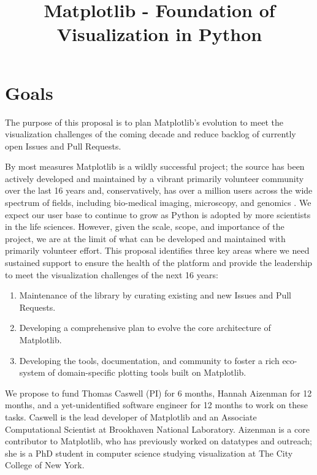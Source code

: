 \documentclass[11pt]{article}  %
\begin{document}
\title{Matplotlib - Foundation of Visualization in Python}
\author{}
\maketitle

\section{Goals}

The purpose of this proposal is to plan Matplotlib's evolution to meet
the visualization challenges of the coming decade and reduce backlog
of currently open Issues and Pull Requests.

By most measures Matplotlib is a wildly successful project; the source
has been actively developed and maintained by a vibrant primarily
volunteer community over the last 16 years and, conservatively, has
over a million users across the wide spectrum of fields, including
bio-medical imaging, microscopy, and genomics
\cite{Carpenter2006,Wolf2018,10.7717/peerj.453}
\cite{Segata2011,10.1371/journal.pgen.1000695,HASHIMSHONY2012666,
  10.1093/bioinformatics/bts480,Carlile2014,Laganowsky2014,Jiangaac9462,
  10.3389/fninf.2014.00014}.  We expect our user base to continue to
grow as Python is adopted by more scientists in the life sciences.
However, given the scale, scope, and importance of the project, we are
at the limit of what can be developed and maintained with primarily
volunteer effort.  This proposal identifies three key areas where we
need sustained support to ensure the health of the platform and
provide the leadership to meet the visualization challenges of the
next 16 years:

\begin{enumerate}[label=\alph*)]
  \item Maintenance of the library by curating existing and new Issues
    and Pull Requests.
  \item Developing a comprehensive plan to evolve the core architecture
    of Matplotlib.
  \item Developing the tools, documentation, and community to foster a
    rich eco-system of domain-specific plotting tools built on
    Matplotlib.
\end{enumerate}


We propose to fund Thomas Caswell (PI) for 6 months, Hannah Aizenman
for 12 months, and a yet-unidentified software engineer for 12 months to
work on these tasks.  Caswell is the lead developer of Matplotlib and
an Associate Computational Scientist at Brookhaven National
Laboratory.  Aizenman is a core contributor to Matplotlib, who has
previously worked on datatypes and outreach; she is a PhD student in
computer science studying visualization at The City College of New
York.
\end{document}
